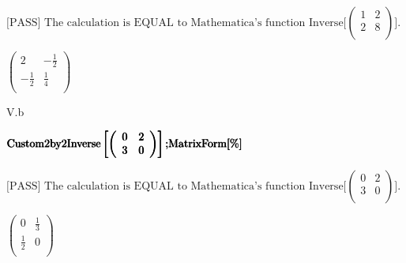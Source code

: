 \documentclass{article}
\begin{document}
\begin{doublespace}
\\
\\
\pmb{];}\\
\pmb{];}\\
\\
\)
\end{doublespace}

\noindent\(\text{[PASS] The calculation is EQUAL to Mathematica's function Inverse[}\left(
\begin{array}{cc}
 1 & 2 \\
 2 & 8 \\
\end{array}
\right)\text{].}\)

\begin{doublespace}
\noindent\(\left(
\begin{array}{cc}
 2 & -\frac{1}{2} \\
 -\frac{1}{2} & \frac{1}{4} \\
\end{array}
\right)\)
\end{doublespace}

V.b

\begin{doublespace}
\noindent\(\pmb{\text{Custom2by2Inverse}\left[\left(
\begin{array}{cc}
 0 & 2 \\
 3 & 0 \\
\end{array}
\right)\right];}\\
\pmb{\text{MatrixForm}[\%]}\)
\end{doublespace}

\noindent\(\text{[PASS] The calculation is EQUAL to Mathematica's function Inverse[}\left(
\begin{array}{cc}
 0 & 2 \\
 3 & 0 \\
\end{array}
\right)\text{].}\)

\begin{doublespace}
\noindent\(\left(
\begin{array}{cc}
 0 & \frac{1}{3} \\
 \frac{1}{2} & 0 \\
\end{array}
\right)\)
\end{doublespace}
\end{document}
